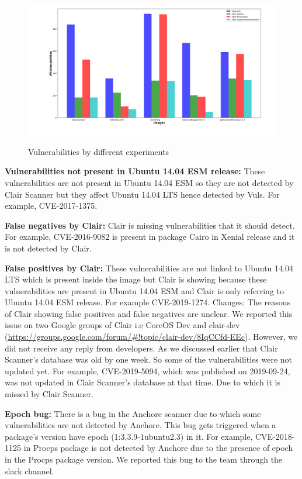 \documentclass[a4paper,num-refs]{oup-contemporary}
\newcommand{\change}[2]{\color{cyan}Changes: #1\color{black}}
\begin{document}
\begin{figure}[b]
        {\includegraphics[scale=1.5,width=\textwidth]
        {Figures/bargraph.png}}
        \caption{\label{fig:bargraph} Vulnerabilities by different experiments}
      \end{figure}
\textbf{Vulnerabilities not present in Ubuntu 14.04 ESM release:} These vulnerabilities are not present in Ubuntu 14.04 ESM so they 
are not detected by Clair Scanner but they affect Ubuntu 14.04 LTS hence detected by Vuls. For example, CVE-2017-1375.

\textbf{False negatives by Clair:} Clair is missing vulnerabilities that it should detect. For example, CVE-2016-9082 
is present in package Cairo in Xenial release and it is not detected by Clair.

\textbf{False positives by Clair:} These vulnerabilities are not linked to Ubuntu 14.04 LTS which is 
present inside the image but Clair is showing because these vulnerabilities are present in Ubuntu 14.04 ESM and 
Clair is only referring to Ubuntu 14.04 ESM release. For example CVE-2019-1274. \change{The reasons of Clair showing
false positives and false negatives are unclear. We reported this issue on two Google groups of Clair i.e CoreOS Dev and
clair-dev (\href{https://groups.google.com/forum/#!topic/clair-dev/8IqCCfd-EEc}{https://groups.google.com/forum/#!topic/clair-dev/8IqCCfd-EEc}).
However, we did not receive any reply from developers.}

\textbf{Database difference:} As we discussed earlier that Clair Scanner's database was old by one week.
                So some of the vulnerabilities were not updated yet. For example, CVE-2019-5094, which
		was published on 2019-09-24, was not 
		updated in Clair Scanner's database at that time. Due to which it is missed by Clair Scanner.


\textbf{Epoch bug:} There is a bug in the Anchore scanner due to which some vulnerabilities are 
		not detected by Anchore. This bug gets triggered when a package’s version have epoch 
		(1:3.3.9-1ubuntu2.3) in it. For example, CVE-2018-1125 in Procps package is not
		detected by Anchore due to the presence of epoch in the Procps package version.
		We reported this bug to the team through the slack channel.
\end{document}
